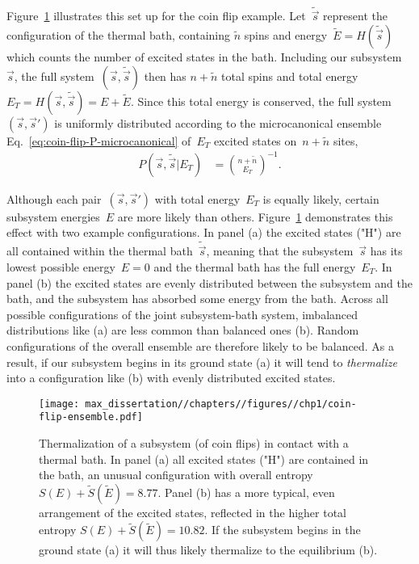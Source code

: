 Figure~\ref{fig:coin-flip-ensemble} illustrates this set up for the coin flip example. Let~$\tilde{\vec{s}}$ represent the configuration of the thermal bath, containing $\tilde{n}$ spins and energy~$\tilde{E} = H(\tilde{\vec{s}})$ which counts the number of excited states in the bath. Including our subsystem~$\vec{s}$, the full system~$(\vec{s},\tilde{\vec{s}})$ then has $n + \tilde{n}$ total spins and total energy~$E_T = H(\vec{s},\tilde{\vec{s}}) = E + \tilde{E}$. Since this total energy is conserved, the full system~$(\vec{s},\vec{s}')$ is uniformly distributed according to the microcanonical ensemble Eq.~\eqref{eq:coin-flip-P-microcanonical} of~$E_T$ excited states on~$n + \tilde{n}$ sites, \begin{align}
    P(\vec{s},\tilde{\vec{s}}|E_T) &= \binom{n + \tilde{n}}{E_T}^{-1}. \label{eq:coin-flip-joint-microcanonical}
\end{align}

Although each pair~$(\vec{s},\vec{s}')$ with total energy~$E_T$ is equally likely, certain subsystem energies~$E$ are more likely than others. Figure~\ref{fig:coin-flip-ensemble} demonstrates this effect with two example configurations. In panel (a) the excited states ("H") are all contained within the thermal bath~$\tilde{\vec{s}}$, meaning that the subsystem~$\vec{s}$ has its lowest possible energy~$E = 0$ and the thermal bath has the full energy~$E_T$. In panel (b) the excited states are evenly distributed between the subsystem and the bath, and the subsystem has absorbed some energy from the bath. Across all possible configurations of the joint subsystem-bath system, imbalanced distributions like (a) are less common than balanced ones (b). Random configurations of the overall ensemble are therefore likely to be balanced. As a result, if our subsystem begins in its ground state (a) it will tend to \emph{thermalize} into a configuration like (b) with evenly distributed excited states.

\begin{figure}
    \centering
    \texttt{[image: max\_dissertation//chapters//figures//chp1/coin-flip-ensemble.pdf]}
    \caption{Thermalization of a subsystem (of coin flips) in contact with a thermal bath. In panel (a) all excited states ("H") are contained in the bath, an unusual configuration with overall entropy $S(E) + \tilde{S}(\tilde{E}) = 8.77$. Panel (b) has a more typical, even arrangement of the excited states, reflected in the higher total entropy $S(E) + \tilde{S}(\tilde{E}) = 10.82$. If the subsystem begins in the ground state (a) it will thus likely thermalize to the equilibrium (b).}
    \label{fig:coin-flip-ensemble}
\end{figure}

